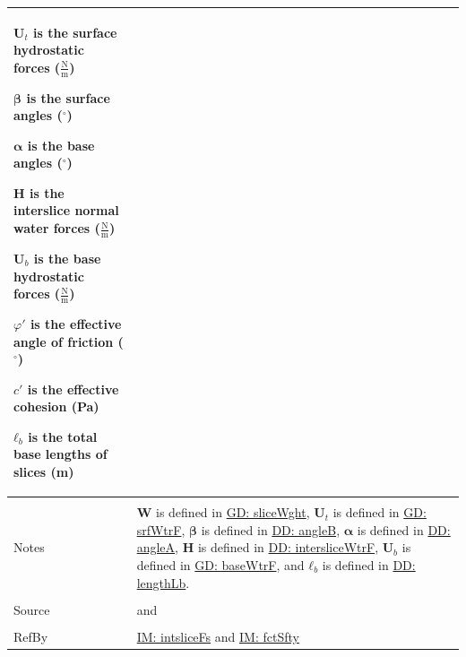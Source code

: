 \documentclass[12pt]{article}
\begin{document}
\begin{minipage}{\textwidth}
\begin{tabular}{>{\raggedright}p{}>{\raggedright\arraybackslash}p{}}
\begin{symbDescription}
                        \item{${\mathbf{U}_{t}}$ is the surface hydrostatic forces ($\frac{\text{N}}{\text{m}}$)}
                        \item{$\mathbf{β}$ is the surface angles (${}^{\circ}$)}
                        \item{$\mathbf{α}$ is the base angles (${}^{\circ}$)}
                        \item{$\mathbf{H}$ is the interslice normal water forces ($\frac{\text{N}}{\text{m}}$)}
                        \item{${\mathbf{U}_{b}}$ is the base hydrostatic forces ($\frac{\text{N}}{\text{m}}$)}
                        \item{$φ'$ is the effective angle of friction (${}^{\circ}$)}
                        \item{$c'$ is the effective cohesion (Pa)}
                        \item{${\mathbf{ℓ}_{b}}$ is the total base lengths of slices (m)}
                        \end{symbDescription}
          \\ \midrule \\
          Notes & $\mathbf{W}$ is defined in \hyperref[GD:sliceWght]{GD: sliceWght}, ${\mathbf{U}_{t}}$ is defined in \hyperref[GD:srfWtrF]{GD: srfWtrF}, $\mathbf{β}$ is defined in \hyperref[DD:angleB]{DD: angleB}, $\mathbf{α}$ is defined in \hyperref[DD:angleA]{DD: angleA}, $\mathbf{H}$ is defined in \hyperref[DD:intersliceWtrF]{DD: intersliceWtrF}, ${\mathbf{U}_{b}}$ is defined in \hyperref[GD:baseWtrF]{GD: baseWtrF}, and ${\mathbf{ℓ}_{b}}$ is defined in \hyperref[DD:lengthLb]{DD: lengthLb}.
          \\ \midrule \\
          Source & \cite{chen2005} and \cite{karchewski2012}
          \\ \midrule \\
          RefBy & \hyperref[IM:intsliceFs]{IM: intsliceFs} and \hyperref[IM:fctSfty]{IM: fctSfty}
          \\ \bottomrule
          \end{tabular}
          \end{minipage}
\par~
\end{document}
